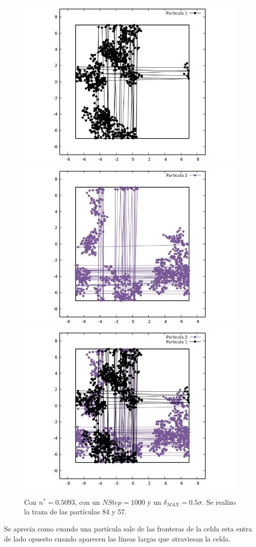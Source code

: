 \documentclass[12pt,letterpaper]{article}
\begin{document}
	\begin{figure}[H]
		\centering
		\includegraphics[width=0.49\linewidth]{Particula1.png}
		\includegraphics[width=0.49\linewidth]{Particula2.png}\\
		\includegraphics[width=0.75\linewidth]{Traza.png}
		\caption{ Con $n^*=0.5093$, con un $NStep=1000$ y un $\delta_{MAX}=0.5\sigma$. Se realizo la traza de las partículas 84 y 57.}
	\end{figure}
Se aprecia como cuando una partícula sale de las fronteras de la celda esta entra de lado opuesto cuando aparecen las lineas largas que atraviesan la celda.
\end{document}
